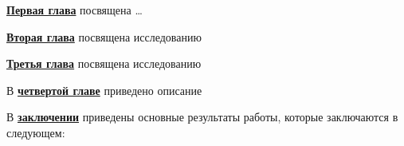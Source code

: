 \underline{\textbf{Первая глава}} посвящена \dots

\underline{\textbf{Вторая глава}} посвящена исследованию

\underline{\textbf{Третья глава}} посвящена исследованию

В \underline{\textbf{четвертой главе}} приведено описание

\FloatBarrier
{}                                  %
В \underline{\textbf{заключении}} приведены основные результаты работы, которые заключаются в следующем:


